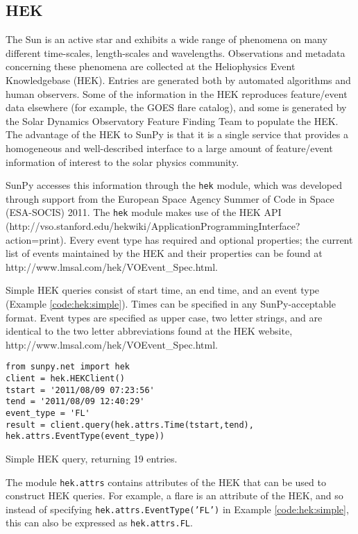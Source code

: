 \subsection{HEK}\label{ssec:hek}

The Sun is an active star and exhibits a wide range of phenomena on
many different time-scales, length-scales and wavelengths.
Observations and metadata concerning these phenomena are collected at
the Heliophysics Event Knowledgebase (HEK).  Entries are generated
both by automated algorithms and human observers.  Some of the
information in the HEK reproduces feature/event data elsewhere (for
example, the GOES flare catalog), and some is generated by the Solar
Dynamics Observatory Feature Finding Team \cite{???} to populate the
HEK.  The advantage of the HEK to SunPy is that it is a single service
that provides a homogeneous and well-described interface to a large
amount of feature/event information of interest to the solar physics
community.

SunPy accesses this information through the \texttt{hek} module, which
was developed through support from the European Space Agency Summer of
Code in Space (ESA-SOCIS) 2011.  The \texttt{hek} module makes use of
the HEK API
(http://vso.stanford.edu/hekwiki/ApplicationProgrammingInterface?action=print).
Every event type has required and optional properties; the current
list of events maintained by the HEK and their properties can be found
at http://www.lmsal.com/hek/VOEvent_Spec.html.

Simple HEK queries consist of start time, an end time, and an event
type (Example \ref{code:hek:simple}). Times can be specified in any
SunPy-acceptable format. Event types are specified as upper case, two
letter strings, and are identical to the two letter abbreviations
found at the HEK website, http://www.lmsal.com/hek/VOEvent_Spec.html.

\begin{listing}
\begin{verbatim}
from sunpy.net import hek
client = hek.HEKClient()
tstart = '2011/08/09 07:23:56'
tend = '2011/08/09 12:40:29'
event_type = 'FL'
result = client.query(hek.attrs.Time(tstart,tend), hek.attrs.EventType(event_type))
\end{verbatim}
\caption{Simple HEK query, returning 19 entries.}
\label{code:hek:simple}
\end{listing}

The module \texttt{hek.attrs} contains attributes of the HEK that can be used to
construct HEK queries.  For example, a flare is an attribute of the
HEK, and so instead of specifying \texttt{hek.attrs.EventType('FL')}
in Example \ref{code:hek:simple}, this can also be expressed as
\texttt{hek.attrs.FL}. 

